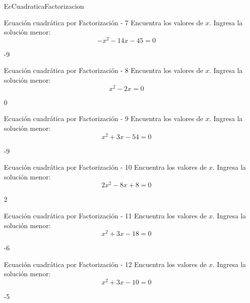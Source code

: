 \documentclass[a4,11pt]{aleph-notas}
\begin{document}
\begin{quiz}{EcCuadraticaFactorizacion}
\begin{numerical}[]%
    {Ecuación cuadrática por Factorización - 7}
    Encuentra los valores de $x$. Ingresa la solución menor:
    \[
        - x^{2} - 14 x - 45 = 0
    \]
    \item[] -9
\end{numerical}

\begin{numerical}[]%
    {Ecuación cuadrática por Factorización - 8}
    Encuentra los valores de $x$. Ingresa la solución menor:
    \[
        x^{2} - 2 x = 0
    \]
    \item[] 0
\end{numerical}

\begin{numerical}[]%
    {Ecuación cuadrática por Factorización - 9}
    Encuentra los valores de $x$. Ingresa la solución menor:
    \[
        x^{2} + 3 x - 54 = 0
    \]
    \item[] -9
\end{numerical}

\begin{numerical}[]%
    {Ecuación cuadrática por Factorización - 10}
    Encuentra los valores de $x$. Ingresa la solución menor:
    \[
        2 x^{2} - 8 x + 8 = 0
    \]
    \item[] 2
\end{numerical}

\begin{numerical}[]%
    {Ecuación cuadrática por Factorización - 11}
    Encuentra los valores de $x$. Ingresa la solución menor:
    \[
        x^{2} + 3 x - 18 = 0
    \]
    \item[] -6
\end{numerical}

\begin{numerical}[]%
    {Ecuación cuadrática por Factorización - 12}
    Encuentra los valores de $x$. Ingresa la solución menor:
    \[
        x^{2} + 3 x - 10 = 0
    \]
    \item[] -5
\end{numerical}


\end{quiz}
\end{document}

